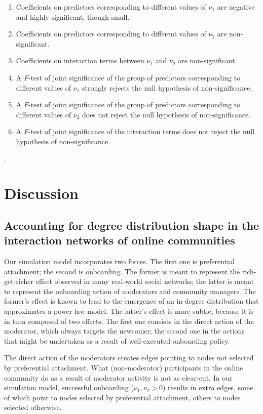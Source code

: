 \documentclass{article}
\begin{document}
\begin{enumerate}
\item Coefficients on predictors corresponding to different values of $\nu_1$ are negative and highly significant, though small.
\item Coefficients on predictors corresponding to different values of $\nu_2$ are non-significant.
\item Coefficients on interaction terms between $\nu_1$ and $\nu_2$ are non-significant.
\item A $F$-test of joint significance of the group of predictors corresponding to different values of $\nu_1$ strongly rejects the null hypothesis of non-significance. 
\item A $F$-test of joint significance of the group of predictors corresponding to different values of $\nu_2$ does not reject the null hypothesis of non-significance.
\item A $F$-test of joint significance of the interaction terms does not reject the null hypothesis of non-significance.
\end{enumerate}.

\section{Discussion}

\subsection{Accounting for degree distribution shape in the interaction networks of online communities}

Our simulation model incorporates two forces. The first one is preferential attachment; the second is onboarding. The former is meant to represent the rich-get-richer effect observed in many real-world social networks; the latter is meant to represent the onboarding action of moderators and community managers. The former's effect is known to lead to the emergence of an in-degree distribution that approximates a power-law model. The latter's effect is more subtle, because it is in turn composed of two effects. The first one consists in the direct action of the moderator, which  always targets the newcomer; the second one in the actions that might be undertaken as a result of well-executed onboarding policy. 

The direct action of the moderators creates edges pointing to nodes not selected by preferential attachment. What (non-moderator) participants in the online community do as a result of moderator activity is not as clear-cut. In our simulation model, successful onboarding ($\nu_1, \nu_2 > 0$) results in extra edges, some of which point to nodes selected by preferential attachment, others to nodes selected otherwise. 
\end{document}
